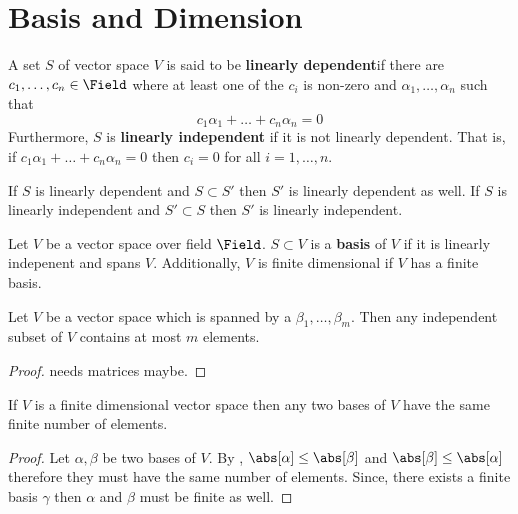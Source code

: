 \section{Basis and Dimension}
\begin{definition}
    A set \(S\) of vector space \(V\) is said to be \textbf{linearly dependent}if there are \(c_1, \dots , c_n \in \Field\) where at least one of the \(c_i\) is non-zero and \(\alpha_1, \dots , \alpha_n\) such that
    \begin{equation*}
        c_1 \alpha_1 + \dots + c_n \alpha_n = 0
    \end{equation*}
    Furthermore, \(S\) is \textbf{linearly independent} if it is not linearly dependent. That is, if \(c_1 \alpha_1 + \dots + c_n \alpha_n = 0\) then \(c_i = 0\) for all \(i = 1 , \dots , n\).
\end{definition}

\begin{corollary}
    If \(S\) is linearly dependent and \(S \subset S'\) then \(S'\) is linearly dependent as well. If \(S\) is linearly independent and \(S' \subset S\) then \(S'\) is linearly independent.
\end{corollary}

\begin{definition}[Basis]
    Let \(V\) be a vector space over field \(\Field\). \(S \subset V\) is a \textbf{basis} of \(V\) if it is linearly indepenent and spans \(V\). Additionally, \(V\) is finite dimensional if \(V\) has a finite basis.
\end{definition}

\begin{theorem} \label{th:BasisUpperLimit}
    Let \(V\) be a vector space which is spanned by a \(\beta_1 ,\dots , \beta_m\). Then any independent subset of \(V\) contains at most \(m\) elements.
\end{theorem}

\begin{proof}
    needs matrices maybe.
\end{proof}

\begin{corollary} \label{col:EqualityOfBasis}
    If \(V\) is a finite dimensional vector space then any two bases of \(V\) have the same finite number of elements.
\end{corollary}

\begin{proof}
    Let \(\alpha, \beta \) be two bases of \(V\). By , \(\abs[\alpha] \leq \abs[\beta]\) and \(\abs[\beta] \leq \abs[\alpha]\) therefore they must have the same number of elements. Since, there exists a finite basis \(\gamma\) then \(\alpha\) and \(\beta\) must be finite as well.
\end{proof}

